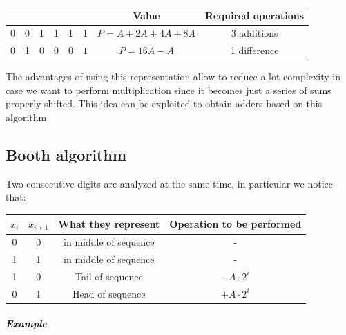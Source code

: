 \begin{center}
  \begin{tabular}{|c|c|c|c|c|c|c|c|}
    \hline
     & & & & & & Value & Required operations\\
    \hline
    0&  0&  1&  1&  1&  1&        $P=A+2A+4A+8A$&   3 additions\\
    0&  1&  0&  0&  0&  $\overline{1}$& $P=16A-A$&      1 difference\\
    \hline
  \end{tabular}
\end{center}

The advantages of using this representation allow to reduce a lot complexity in case we want to perform multiplication since it becomes just a series of sums properly shifted. This idea can be exploited to obtain adders based on this algorithm

\subsection{Booth algorithm}
Two consecutive digits are analyzed at the same time, in particular we notice that:
\begin{center}
\begin{tabular}{|c|c|c|c|}
  \hline
  $x_i$&  $x_{i+1}$&  What they represent&  Operation to be performed\\
  \hline
  0&    0&      in middle of sequence&  -\\
  1&    1&      in middle of sequence&  -\\
  1&    0&      Tail of sequence&   $-A \cdot 2^i$\\
  0&    1&      Head of sequence&   $+A \cdot 2^i$\\
  \hline
\end{tabular}
\end{center}
\subparagraph{Example}

